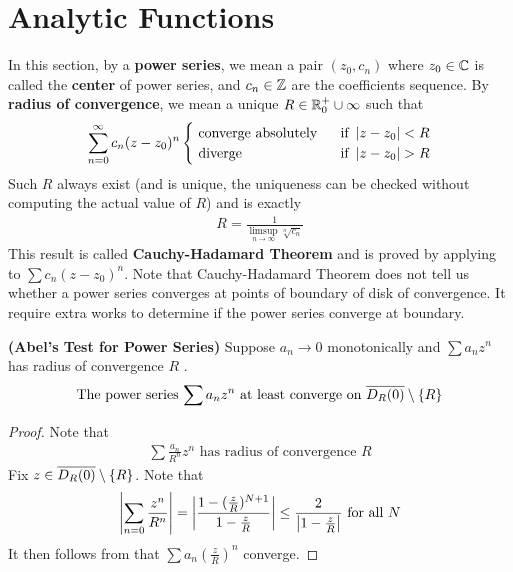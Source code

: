 \documentclass{report}
\begin{document}
\section{Analytic Functions}
\begin{abstract}

\end{abstract}
\begin{mdframed}
In this section, by a  \textbf{power series}, we mean a pair $(z_0,c_n)$ where $z_0 \in\mathbb{C}$ is called the \textbf{center} of power series, and $c_n\in\mathbb{Z}$ are the coefficients sequence. By \textbf{radius of convergence}, we mean a unique  $R \in \mathbb{R}^+_0 \cup  \infty$ such that 
 \begin{align*}
\sum_{n=0}^\infty c_n(z-z_0)^n
\begin{cases}
  \text{ converge absolutely }& \text{ if  }\abso{z-z_0}<R\\
  \text{ diverge }& \text{ if  }\abso{z-z_0}>R\\
\end{cases}
\end{align*}
Such $R$ always exist (and is unique, the uniqueness can be checked without computing the actual value of $R$) and is exactly 
\begin{align}
\label{Cauchy-Hadamard}
R=\frac{1}{\limsup_{n\to\infty} \sqrt[n]{c_n} }
\end{align}
This result is called \textbf{Cauchy-Hadamard Theorem} and is proved by applying  to $\sum c_n(z-z_0)^n$. Note that Cauchy-Hadamard Theorem does not tell us whether a power series converges at points of boundary of disk of convergence. It require extra works to determine if the power series converge at boundary. 
\end{mdframed}
\begin{theorem}
\label{Abel's Test for Power Series}
\textbf{(Abel's Test for Power Series)} Suppose $a_n\to0$ monotonically and $\sum a_nz^n$ has radius of convergence $R$ . 
\begin{align*}
  \text{ The power series $\sum a_nz^n$ at least converge on $\overline{D_R(0)}\setminus \{ R \}$ }
\end{align*}
\end{theorem}
\begin{proof}
Note that 
\begin{align*}
\sum \frac{a_n}{R^n}z^n\text{ has radius of convergence }R
\end{align*}
Fix $z\in \overline{D_R(0)}\setminus \{ R \}$. Note that 
\begin{align*}
\left|\sum_{n=0}\frac{z^n}{R^n}\right|= \left|\frac{1-(\frac{z}{R})^{N+1}}{1-\frac{z}{R}}\right| \leq \frac{2}{\left|1-\frac{z}{R}\right|}\text{ for all }N
\end{align*}
It then follows from   that $\sum a_n (\frac{z}{R})^n$ converge.
\end{proof}
\end{document}
